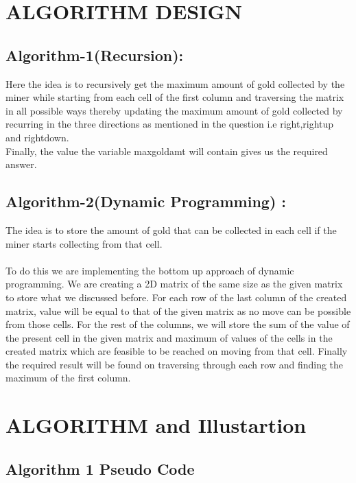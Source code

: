 \documentclass[conference]{IEEEtran}
\begin{document}
\section{ALGORITHM DESIGN}



\subsection{Algorithm-1(Recursion):}

Here the idea is to recursively get the maximum amount of gold collected by the miner while starting from each cell of the first column and traversing the matrix in all possible ways thereby updating the maximum amount of gold collected by recurring  in the three directions as mentioned in the question i.e right,right\textunderscore up and right\textunderscore down.\\
Finally, the value the variable max\textunderscore gold\textunderscore amt will contain gives us the required answer.


\subsection{Algorithm-2(Dynamic Programming) :}

The idea is to store the amount of gold that can be collected in each cell if the miner starts collecting from that cell.\\\\

To do this we are implementing the bottom up approach of dynamic programming. We are creating a 2D matrix of the same size as the given matrix to store what we discussed before. For each row of the last column of the created matrix, value will be equal to that of the given matrix as no move can be possible from those cells. For the rest of the columns, we will store the sum of the value of the present cell in the given matrix and maximum of values of the cells in the created matrix which are feasible to be reached on moving from that cell. Finally the required result will be found on traversing through each row and finding the maximum of the first column.



\section{ALGORITHM and Illustartion}

\subsection{Algorithm 1 Pseudo Code}\label{AA}
\end{document}
